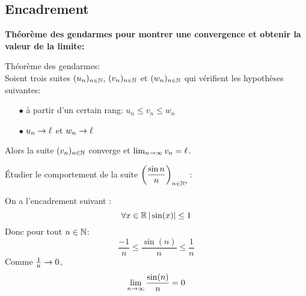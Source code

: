 \documentclass[a4paper, 11pt]{article}
\begin{document}
\subsection{Encadrement}

 {\textbf{Th\'eor\`{e}me des gendarmes pour montrer une convergence et obtenir la valeur de la limite:}}\\

{  

\begin{theorem} Th\'eor\`{e}me des gendarmes:\\
 Soient trois suites $(u_n)_{n\in \mathbb{N}}$, $(v_n)_{n\in \mathbb{N}}$ et $(w_n)_{n\in \mathbb{N}}$ qui v\'erifient les hypoth\`eses suivantes:\vspace{0.3cm}
\begin{itemize}
\item[$\bullet$]
\`a partir d'un certain rang: $u_n\leq v_n\leq w_n$
\item[$\bullet$] $u_n \rightarrow \ell $ et $w_n\rightarrow \ell$
\end{itemize}
Alors la suite $(v_n)_{n\in \mathbb{N}}$ converge et $\lim_{n\rightarrow \infty} v_n=\ell$. 
\end{theorem}

}

\begin{exemple} \'Etudier le comportement de la suite $\left(  \displaystyle\frac{\sin{n}}{n} \right)_{n\in\mathbb{N}^{\star}}$:


\end{exemple}

\begin{cor}
On a l'encadrement suivant :
$$\forall x\in\mathbb{R}\, |\sin(x)|\leq 1$$
Donc pour tout $n\in \mathbb{N}$:
$$\frac{-1}{n}\leq \frac{\sin(n)}{n}\leq \frac{1}{n}$$
Comme 
$\frac{1}{n}\rightarrow 0$, $$\lim_{n\rightarrow \infty} \frac{\sin(n)}{n}=0$$

\end{cor}
\end{document}

